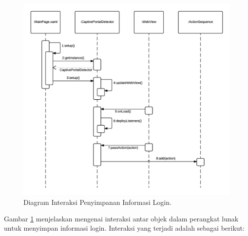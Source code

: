\begin{figure}[!htb]
    \centering
    \includegraphics[scale=0.8]{Gambar/SequenceDiagramLoginInformationSaving.png}
    \caption[Diagram Interaksi Penyimpanan Informasi Login.]{Diagram Interaksi Penyimpanan Informasi Login.} 
    \label{fig:LoginInformationSavingSequenceDiagram}
\end{figure}

Gambar \ref{fig:LoginInformationSavingSequenceDiagram} menjelaskan mengenai interaksi antar objek dalam perangkat lunak untuk menyimpan informasi login. Interaksi yang terjadi adalah sebagai berikut:

